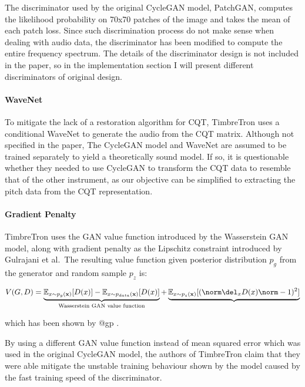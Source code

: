 \documentclass[]{article}
\begin{document}
The discriminator used by the original CycleGAN model, PatchGAN,
computes the likelihood probability on 70x70 patches of the image and
takes the mean of each patch loss. Since such discrimination process do
not make sense when dealing with audio data, the discriminator has been
modified to compute the entire frequency spectrum. The details of the
discriminator design is not included in the paper, so in the
implementation section I will present different discriminators of
original design.

\paragraph{WaveNet}

To mitigate the lack of a restoration algorithm for CQT, TimbreTron uses
a conditional WaveNet to generate the audio from the CQT matrix.
Although not specified in the paper, The CycleGAN model and WaveNet are
assumed to be trained separately to yield a theoretically sound model.
If so, it is questionable whether they needed to use CycleGAN to
transform the CQT data to resemble that of the other instrument, as our
objective can be simplified to extracting the pitch data from the CQT
representation.

\paragraph{Gradient Penalty}

TimbreTron uses the GAN value function introduced by the Wasserstein GAN
model, along with gradient penalty as the Lipschitz constraint
introduced by Gulrajani et al.~The resulting value function given
posterior distribution \(p_g\) from the generator and random sample
\(p_z\) is:

\begin{equation}
    V(G, D) = \underbrace{
        \mathbb{E}_{x \sim p_{g}(\mathbf{x})} [D(x)] - \mathbb{E}_{x \sim p_{data}(\mathbf{x})} [D(x)]
        }_\textrm{Wasserstein GAN value function} +
        \underbrace{
            \mathbb{E}_{x \sim p_z(\mathbf{x})} [(\norm \del_x D(x)\norm - 1)^2]
        }
            
\end{equation}

which has been shown by @gp .

By using a different GAN value function instead of mean squared error
which was used in the original CycleGAN model, the authors of TimbreTron
claim that they were able mitigate the unstable training behaviour shown
by the model caused by the fast training speed of the discriminator.
\end{document}
